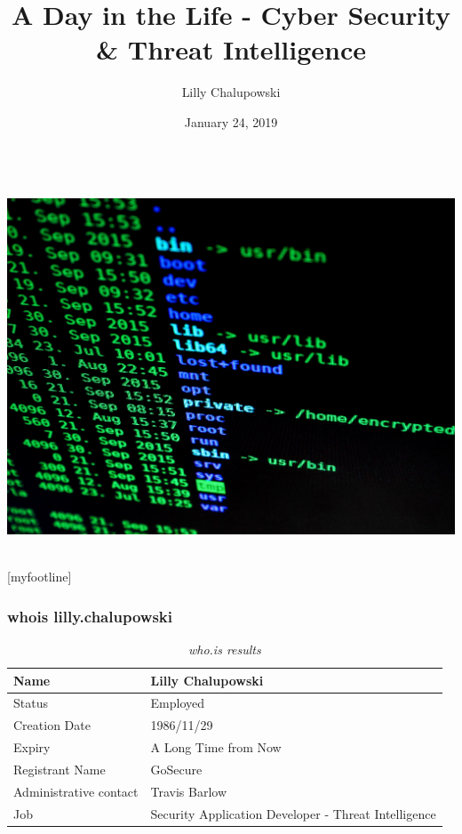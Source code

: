 \documentclass[aspectratio=169]{beamer}
\title{A Day in the Life - Cyber Security \& Threat Intelligence}
\institute{GoSecure}
\author{Lilly Chalupowski}
\date{January 24, 2019}
\begin{document}
\begin{frame}[t]
  \begin{center}
    \begingroup
    \fontsize{20pt}{20pt}\selectfont
    \inserttitle \\
    \endgroup
    \bigskip
    \includegraphics[scale=0.05]{title} \\
    \bigskip
    \insertauthor \\
    \insertdate
  \end{center}
\end{frame}

[myfootline]

\begin{frame}
  \frametitle{whois lilly.chalupowski}
  \begin{table}
    \caption{\textit{who.is results}}
    \begin{tabularx}{\textwidth}{|X|X|}
      \hline
      Name & Lilly Chalupowski \\
      \hline
      Status & Employed \\
      \hline
      Creation Date & 1986/11/29 \\
      \hline
      Expiry & A Long Time from Now \\
      \hline
      Registrant Name & GoSecure \\
      \hline
      Administrative contact & Travis Barlow \\
      \hline
      Job & Security Application Developer - Threat Intelligence \\
      \hline
    \end{tabularx}
  \end{table}
\end{frame}
\end{document}
